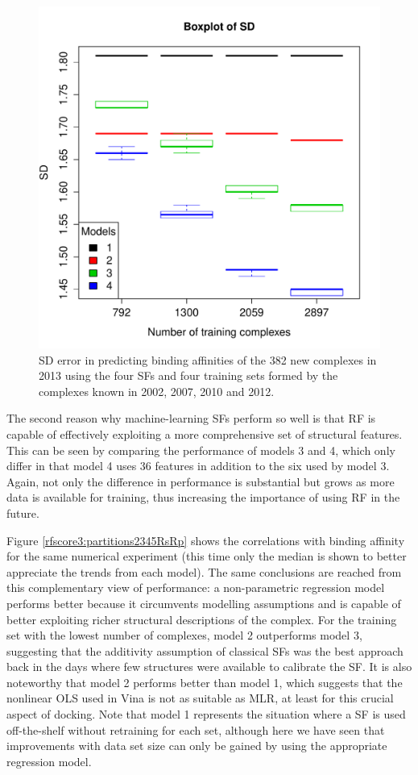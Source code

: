 \begin{figure}
\centering
\includegraphics[width=\linewidth]{../rfscore3/set-2-tst-sdev-boxplot.pdf}
\caption{SD error in predicting binding affinities of the 382 new complexes in 2013 using the four SFs and four training sets formed by the complexes known in 2002, 2007, 2010 and 2012.}
\label{rfscore3:partitions2345SD}
\end{figure}

The second reason why machine-learning SFs perform so well is that RF is capable of effectively exploiting a more comprehensive set of structural features. This can be seen by comparing the performance of models 3 and 4, which only differ in that model 4 uses 36 features in addition to the six used by model 3. Again, not only the difference in performance is substantial but grows as more data is available for training, thus increasing the importance of using RF in the future.

Figure \ref{rfscore3:partitions2345RsRp} shows the correlations with binding affinity for the same numerical experiment (this time only the median is shown to better appreciate the trends from each model). The same conclusions are reached from this complementary view of performance: a non-parametric regression model performs better because it circumvents modelling assumptions and is capable of better exploiting richer structural descriptions of the complex. For the training set with the lowest number of complexes, model 2 outperforms model 3, suggesting that the additivity assumption of classical SFs was the best approach back in the days where few structures were available to calibrate the SF. It is also noteworthy that model 2 performs better than model 1, which suggests that the nonlinear OLS used in Vina is not as suitable as MLR, at least for this crucial aspect of docking. Note that model 1 represents the situation where a SF is used off-the-shelf without retraining for each set, although here we have seen that improvements with data set size can only be gained by using the appropriate regression model.

